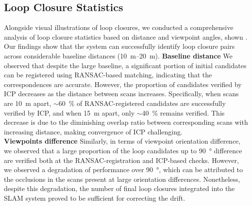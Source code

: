 \subsection*{Loop Closure Statistics}
Alongside visual illustrations of loop closures, we conducted a comprehensive analysis of loop closure statistics based on distance and viewpoint angles, shown . Our findings show that the system can successfully identify loop closure pairs across considerable baseline distances (\SIrange{10}{20}{\meter}). 
\newline
\textbf{Baseline distance}\hspace{0.5em} We observed that despite the large baseline, a significant portion of initial candidates can be registered using RANSAC-based matching, indicating that the correspondences are accurate. However, the proportion of candidates verified by ICP decreases as the distance between scans increases. Specifically, when scans are \SI{10}{\meter} apart, $\sim$\SI{60}{\percent} of RANSAC-registered candidates are successfully verified by ICP, and when \SI{15}{\meter} apart, only $\sim$\SI{40}{\percent} remains verified. This decrease is due to the diminishing overlap ratio between corresponding scans with increasing distance, making convergence of ICP challenging. \\
\textbf{Viewpoints difference}\hspace{0.5em} Similarly, in terms of viewpoint orientation difference, we observed that a large proportion of the loop candidates up to \SI{90}{\degree} difference are verified both at the RANSAC-registration and ICP-based checks. However, we observed a degradation of performance over \SI{90}{\degree}, which can be attributed to the occlusions in the scans present at large orientation differences. Nonetheless, despite this degradation, the number of final loop closures integrated into the SLAM system proved to be sufficient for correcting the drift.   

